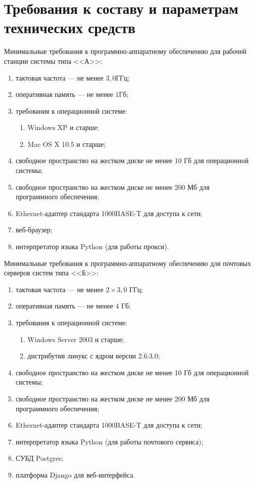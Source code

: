 \section{Требования к составу и параметрам технических средств}
Минимальные требования к программно-аппаратному обеспечению для рабочей станции системы типа <<А>>:

\begin{enumerate}
	\item тактовая частота  --- не менее $3,0 \text{ГГц}$;
	\item оперативная память --- не менее $1 \text{Гб}$;
	\item требования к операционной системе:
	\begin{enumerate}
		\item Windows XP и старше;
		\item Mac OS X 10.5 и старше;
	\end{enumerate}
	\item свободное пространство на жестком диске не менее 10 Гб для операционной системы;
	\item свободное пространство на жестком диске не менее 200 Мб для программного обеспечения;
	\item Ethernet-адаптер стандарта 1000BASE-T для доступа к сети;
	\item веб-браузер;
	\item интерпретатор языка Python (для работы прокси).
\end{enumerate}

Минимальные требования к программно-аппаратному обеспечению для почтовых серверов систем типа <<Б>>:

\begin{enumerate}
	\item тактовая частота  --- не менее $2\times3,0$ ГГц; 
	\item оперативная память --- не менее $4$ Гб;
	\item требования к операционной системе:
	\begin{enumerate}
		\item Windows Server 2003 и старше;
		\item дистрибутив линукс с ядром версии 2.6:3.0;
	\end{enumerate}
	\item свободное пространство на жестком диске не менее 10 Гб для операционной системы;
	\item свободное пространство на жестком диске не менее 200 Мб для программного обеспечения;
	\item Ethernet-адаптер стандарта 1000BASE-T для доступа к сети;
	\item интерпретатор языка Python (для работы почтового сервиса);
	\item СУБД Postgres;	
	\item платформа Django для веб-интерфейса.
\end{enumerate}

